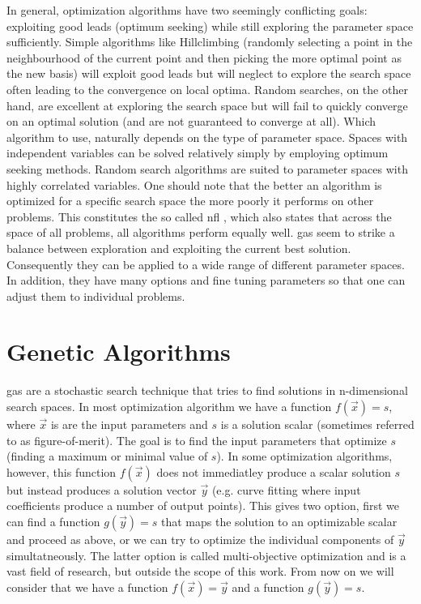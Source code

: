 In general, optimization algorithms have two seemingly conflicting goals: exploiting good leads (optimum seeking) while still exploring the parameter space sufficiently. Simple algorithms like Hillclimbing (randomly selecting a point in the neighbourhood of the current point and then picking the more optimal point as the new basis) will exploit good leads but will neglect to explore the search space often leading to the convergence on local optima. Random searches, on the other hand, are excellent at exploring the search space but will fail to quickly converge on an optimal solution (and are not guaranteed to converge at all). Which algorithm to use, naturally depends on the type of parameter space. Spaces with independent variables can be solved relatively simply by employing optimum seeking methods. Random search algorithms are suited to parameter spaces with highly correlated variables. 
One should note that the better an algorithm is optimized for a specific search space the more poorly it performs on other problems. This constitutes the so called  \gls{nfl} , which also states that across the space of all problems, all algorithms perform equally well. \glspl{ga} seem to strike a balance between exploration and exploiting the current best solution. Consequently they can be applied to a wide range of different parameter spaces. In addition, they have many options and fine tuning parameters so that one can adjust them to individual problems. 

\section{Genetic Algorithms}
\glspl{ga} are a stochastic search technique that tries to find solutions in n-dimensional search spaces. In most optimization algorithm we have a function $f(\vec{x})=s$, where $\vec{x}$ is are the input parameters and $s$ is a solution scalar (sometimes referred to as figure-of-merit). The goal is to find the input parameters that optimize $s$ (finding a maximum or minimal value of $s$). In some optimization algorithms, however,  this function $f(\vec{x})$ does not immediatley produce a scalar solution $s$ but instead produces a solution vector $\vec{y}$ (e.g. curve fitting where input coefficients produce a number of output points). This gives two option, first we can find a function $g(\vec{y})=s$ that maps the solution to an optimizable scalar and proceed as above, or we can try to optimize the individual components of $\vec{y}$ simultatneously. The latter option is called multi-objective optimization and is a vast field of research, but outside the scope of this work. From now on we will consider that we have a function $f(\vec{x})=\vec{y}$ and a function $g(\vec{y})=s$. 

